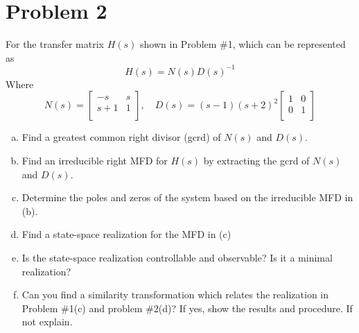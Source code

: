 \documentclass{article}
\begin{document}
\newpage
\section*{Problem 2}
For the transfer matrix $H(s)$ shown in Problem \#1, which can be represented as
$$ H(s) = N(s)D(s)^{-1} $$
Where
$$
N(s) =
\begin{bmatrix}
-s & s \\
s+1 & 1 \\
\end{bmatrix}
,\quad
D(s) =
(s-1)(s+2)^2
\begin{bmatrix}
1 & 0 \\
0 & 1 \\
\end{bmatrix}
$$
\begin{enumerate}[(a)]
\item Find a greatest common right divisor (gcrd) of $N(s)$ and $D(s)$.
\newline

\item Find an irreducible right MFD for $H(s)$ by extracting the gcrd of $N(s)$ and $D(s)$.
\newline

\item Determine the poles and zeros of the system based on the irreducible MFD in (b).
\newline

\item Find a state-space realization for the MFD in (c)
\newline

\item Is the state-space realization controllable and observable? Is it a minimal realization?
\newline

\item Can you find a similarity transformation which relates the realization in Problem \#1(c) and problem \#2(d)?
If yes, show the results and procedure. If not explain.
\newline

\end{enumerate}

\newpage
\end{document}
